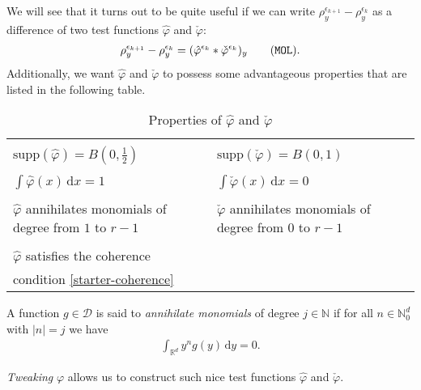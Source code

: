We will see that it turns out to be quite useful if we can write $\rho_y^{\epsilon_{k+1}} - \rho_y^{\epsilon_k}$ as a difference of two test functions $\hat \varphi$ and $\check \varphi$:
\begin{align*}\label{rho-dif}
    \rho_y^{\epsilon_{k+1}} - \rho_y^{\epsilon_k} = (\hat \varphi^{\epsilon_k} * \check \varphi^{\epsilon_k} )_y \tag{\texttt{MOL}}.
\end{align*}
Additionally, we want $\hat \varphi$ and $\check \varphi$ to possess some advantageous properties that are listed in the following table.

\begin{table}[H]
\centering
\begin{tabular}{p{50mm}|p{50mm}}
    \hline
    \\[-0.5em]
    $\mathrm{supp}(\hat \varphi) = B(0,\frac{1}{2})$ &  $\mathrm{supp}(\check \varphi) = B(0,1)$\\
    \\[-0.5em]
    $\int \hat \varphi(x) \, \mathrm{d}x = 1$&  $\int \check \varphi(x) \, \mathrm{d}x = 0$\\
    \\[-0.5em]
    $\hat \varphi$ annihilates monomials \newline of degree from $1$ to $r-1$ & $\check \varphi $ annihilates monomials  \newline of degree from $0$ to $r-1$\\
    \\[-0.5em]
    $\hat \varphi$ satisfies the coherence \\condition \eqref{starter-coherence}& \\[0.5em]
    \hline
\end{tabular}
\caption{Properties of $\hat \varphi$ and $\check \varphi$}
\label{table:properties-tweak}
\end{table}

\begin{definition}
    A function $g \in \mathcal{D}$ is said to \emph{annihilate monomials} of degree $j \in \mathbb{N}$ if for all $n \in \mathbb{N}^d_0$ with $|n| = j$ we have
    \begin{align*}
        \int_{\mathbb{R}^d} y^n g (y) \, \mathrm{d}y = 0.
    \end{align*}
\end{definition}

\emph{Tweaking} $\varphi$ allows us to construct such nice test functions $\hat \varphi$ and $\check \varphi$.


